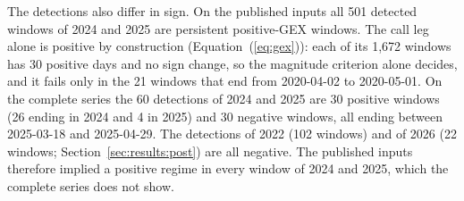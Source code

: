 The detections also differ in sign. On the published inputs all 501 detected windows of 2024 and 2025 are persistent positive-GEX windows. The call leg alone is positive by construction (Equation~(\ref{eq:gex})): each of its 1{,}672 windows has 30 positive days and no sign change, so the magnitude criterion alone decides, and it fails only in the 21 windows that end from 2020-04-02 to 2020-05-01. On the complete series the 60 detections of 2024 and 2025 are 30 positive windows (26 ending in 2024 and 4 in 2025) and 30 negative windows, all ending between 2025-03-18 and 2025-04-29. The detections of 2022 (102 windows) and of 2026 (22 windows; Section~\ref{sec:results:post}) are all negative. The published inputs therefore implied a positive regime in every window of 2024 and 2025, which the complete series does not show.

